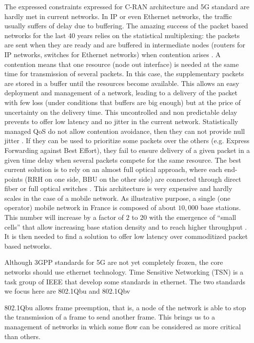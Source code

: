 \documentclass[a4paper,10pt]{article}
\begin{document}
The expressed constraints expressed for C-RAN architecture and 5G standard are hardly met in current networks. In IP or even Ethernet networks, the traffic usually suffers of delay due to buffering. The amazing success of the packet based networks for the last 40 years relies on the statistical multiplexing: the packets are sent when they are ready and are buffered in intermediate nodes (routers for IP networks, switches for Ethernet networks) when contention arises \cite{venkatramani1994supporting}. A contention means that one resource (node out interface) is needed at the same time for transmission of several packets. In this case, the supplementary packets are stored in a buffer until the resources become available. This allows an easy deployment and management of a network, leading to a delivery of the packet with few loss (under conditions that buffers are big enough) but at the price of uncertainty on the delivery time. This uncontrolled and non predictable delay prevents to offer low latency and no jitter in the current network. Statistically managed QoS do not allow contention avoidance, then they can not provide null jitter \cite{khaunte2003technique}. If they can be used to prioritize some packets over the others (e.g. Express Forwarding against Best Effort), they fail to ensure delivery of a given packet in a given time delay when several packets compete for the same resource. 
The best current solution is to rely on an almost full optical approach, where each end-points (RRH on one side, BBU on the other side) are connected through direct fiber or full optical switches \cite{leclerc2016transmission}\cite{leclerc2016signaling}. This architecture is very expensive and hardly scales in the case of a mobile network. As illustrative purpose, a single (one operator) mobile network in France is composed of about $10,000$ base stations. This number will increase by a factor of $2$ to $20$ with the emergence of “small cells” that allow increasing base station density and to reach higher throughput \cite{leclerc2016transmission}\cite{leclerc2016signaling}. It is then needed to find a solution to offer low latency over commoditized packet based networks. 

Although 3GPP standards for 5G are not yet completely frozen, the core networks should use ethernet technology. Time Sensitive Networking (TSN) is a task group of IEEE that develop some standards in ethernet. The two standards we focus here are 802.1Qbu and 802.1Qbv \cite{ieee802}  
  
802.1Qbu allows frame preemption, that is, a node of the network is able to stop the transmission of a frame to send another frame. This brings us to a management of networks in which some flow can be considered as more critical than others. 
\end{document}
